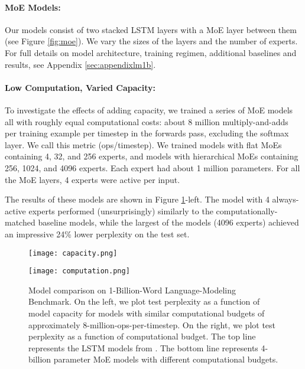 \documentclass{article} %
\begin{document}
\paragraph{MoE Models:} Our models consist of two stacked LSTM layers with a MoE layer between them (see Figure \ref{fig:moe}).  We vary the sizes of the layers and the number of experts.   For full details on model architecture, training regimen, additional baselines and results, see Appendix \ref{sec:appendixlm1b}.   

\paragraph{Low Computation, Varied Capacity:} To investigate the effects of adding capacity, we trained a series of MoE models all with roughly equal computational costs: about 8 million multiply-and-adds per training example per timestep in the forwards pass, excluding the softmax layer.  We call this metric (ops/timestep).  We trained models with flat MoEs containing 4, 32, and 256 experts, and models with hierarchical MoEs containing 256, 1024, and 4096 experts.  Each expert had about 1 million parameters.  For all the MoE layers, 4 experts were active per input.

The results of these models are shown in Figure \ref{fig:lm1b}-left.   The model with 4 always-active experts performed (unsurprisingly) similarly to the computationally-matched baseline models, while the largest of the models (4096 experts) achieved an impressive 24\% lower perplexity on the test set.



\begin{figure}[h!]
\centering
\begin{minipage}{.49\textwidth}
  \centering
  \texttt{[image: capacity.png]}
\end{minipage}
\begin{minipage}{.49\textwidth}
  \centering
  \texttt{[image: computation.png]}
\end{minipage}
\caption{Model comparison on 1-Billion-Word Language-Modeling Benchmark.  On the left, we plot test perplexity as a function of model capacity for models with similar computational budgets of approximately 8-million-ops-per-timestep.  On the right, we plot test perplexity as a function of computational budget.  The top line represents the LSTM models from \citep{RafalNoam16}.  The bottom line represents 4-billion parameter MoE models with different computational budgets.}
\label{fig:lm1b}
\end{figure}
\end{document}
